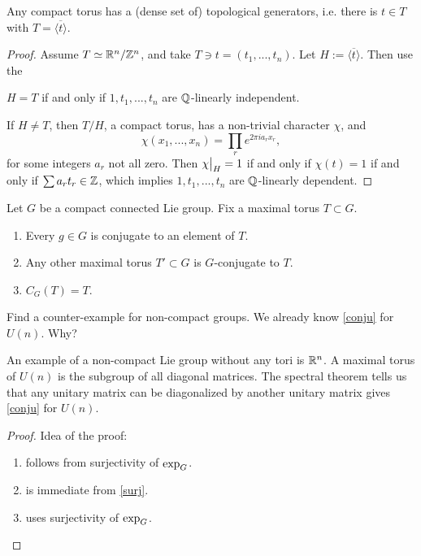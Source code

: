 \begin{lem}
Any compact torus has a (dense set of) topological generators, i.e. there is
$t \in T$ with $T = \overline{\langle t \rangle}.$
\end{lem}

\begin{proof}
Assume $T \simeq \mathbb{R}^n/\mathbb{Z}^n$, and take $T \ni t = (t_1, ..., t_n)$. Let
$H := \overline{\langle t \rangle}$. Then use the

\begin{lem}
$H = T$ if and only if $1, t_1, ..., t_n$ are $\mathbb{Q}$-linearly independent.
\end{lem}

If $H \neq T$, then $T/H$, a compact torus, has a non-trivial character $\chi$,
and \[ \chi(x_1, ..., x_n) = \prod_r e^{2 \pi i a_r x_r}, \]  for some integers
$a_r$ not all zero. Then $\restr{\chi}{H} = 1$ if and only if $\chi(t) = 1$
if and only if $\sum a_r t_r \in \mathbb{Z}$, which implies $1, t_1, ..., t_n$ are
$\mathbb{Q}$-linearly dependent.
\end{proof}

\begin{thm}
Let $G$ be a compact connected Lie group. Fix a maximal torus $T \subset G$.
\begin{enumerate}[(1)]
\item\label{conju} Every $g \in G$ is conjugate to an element of $T$.
\item Any other maximal torus $T' \subset G$ is $G$-conjugate to $T$.
\item $C_G(T) = T$.
\end{enumerate}
\end{thm}

\begin{ex}
Find a counter-example for non-compact groups. We already know \ref{conju}
for $U(n)$. Why?

An example of a non-compact Lie group without any tori is $\mathbb{R}^n$. A maximal 
torus of $U(n)$ is the subgroup of all diagonal matrices. The spectral theorem
tells us that any unitary matrix can be diagonalized by another unitary matrix 
gives \ref{conju} for $U(n)$.
\end{ex}

\begin{proof} Idea of the proof:

\begin{enumerate}[(1)]
\item\label{surj} follows from surjectivity of $\operatorname{exp}_G$.
\item is immediate from \ref{surj}.
\item uses surjectivity of $\operatorname{exp}_G$.
\end{enumerate}

\end{proof}

